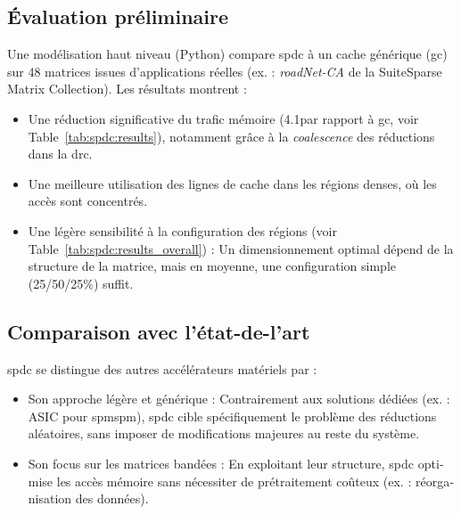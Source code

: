 \begin{otherlanguage}{french}
\subsection*{\'Evaluation préliminaire}

Une modélisation haut niveau (Python) compare \acrlong{spdc} à un cache générique (\acrshort{gc}) sur 48 matrices issues d'applications réelles (ex. : \textit{roadNet-CA} de la SuiteSparse Matrix Collection).
Les résultats montrent :
\begin{itemize}
    \item Une réduction significative du trafic mémoire (4.1\tms par rapport à \acrshort{gc}, voir Table~\ref{tab:spdc:results}), notamment grâce à la \textit{coalescence} des réductions dans la \acrshort{drc}.
    \item Une meilleure utilisation des lignes de cache dans les régions denses, où les accès sont concentrés.
    \item Une légère sensibilité à la configuration des régions (voir Table~\ref{tab:spdc:results_overall}) : Un dimensionnement optimal dépend de la structure de la matrice, mais en moyenne, une configuration simple (25/50/25\%) suffit.
\end{itemize}

\subsection*{Comparaison avec l'état-de-l'art}

\acrlong{spdc} se distingue des autres accélérateurs matériels par :
\begin{itemize}
    \item Son approche légère et générique : Contrairement aux solutions dédiées (ex. : ASIC pour \acrshort{spmspm}), \acrlong{spdc} cible spécifiquement le problème des réductions aléatoires, sans imposer de modifications majeures au reste du système.
    \item Son focus sur les matrices bandées : En exploitant leur structure, \acrlong{spdc} optimise les accès mémoire sans nécessiter de prétraitement coûteux (ex. : réorganisation des données).
\end{itemize}
 

\end{otherlanguage}
